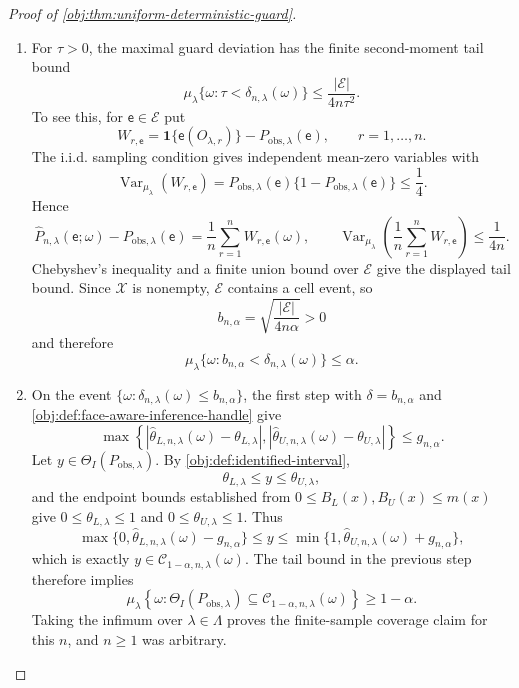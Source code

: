 \documentclass[11pt]{article}
\begin{document}
\begin{proof}[Proof of \cref{obj:thm:uniform-deterministic-guard}]
\begin{enumerate}
\item For \(\tau>0\), the maximal guard deviation has the finite second-moment
tail bound
\[
\mu_\lambda\{\omega:\tau<\delta_{n,\lambda}(\omega)\}
\le
\frac{|\mathcal E|}{4n\tau^2}.
\]
To see this, for \(\mathsf e\in\mathcal E\) put
\[
W_{r,\mathsf e}
=
\mathbf 1\{\mathsf e(O_{\lambda,r})\}
-
P_{\mathrm{obs},\lambda}(\mathsf e),
\qquad r=1,\ldots,n .
\]
The i.i.d. sampling condition gives independent mean-zero variables with
\[
\operatorname{Var}_{\mu_\lambda}(W_{r,\mathsf e})
=
P_{\mathrm{obs},\lambda}(\mathsf e)
\{1-P_{\mathrm{obs},\lambda}(\mathsf e)\}
\le \frac14.
\]
Hence
\[
\widehat P_{n,\lambda}(\mathsf e;\omega)
-
P_{\mathrm{obs},\lambda}(\mathsf e)
=
\frac1n\sum_{r=1}^n W_{r,\mathsf e}(\omega),
\qquad
\operatorname{Var}_{\mu_\lambda}\!\left(
\frac1n\sum_{r=1}^n W_{r,\mathsf e}
\right)
\le
\frac{1}{4n}.
\]
Chebyshev's inequality and a finite union bound over \(\mathcal E\) give the
displayed tail bound.
Since \(\mathcal X\) is nonempty, \(\mathcal E\) contains
a cell event, so
\[
b_{n,\alpha}
=
\sqrt{\frac{|\mathcal E|}{4n\alpha}}>0
\]
and therefore
\[
\mu_\lambda\{\omega:b_{n,\alpha}<\delta_{n,\lambda}(\omega)\}
\le
\alpha .
\]

\item On the event
\(\{\omega:\delta_{n,\lambda}(\omega)\le b_{n,\alpha}\}\), the first step with
\(\delta=b_{n,\alpha}\) and \cref{obj:def:face-aware-inference-handle} give
\[
\max\left\{
\left|\widehat\theta_{L,n,\lambda}(\omega)-\theta_{L,\lambda}\right|,
\left|\widehat\theta_{U,n,\lambda}(\omega)-\theta_{U,\lambda}\right|
\right\}
\le
g_{n,\alpha}.
\]
Let \(y\in\Theta_I(P_{\mathrm{obs},\lambda})\).  By
\cref{obj:def:identified-interval},
\[
\theta_{L,\lambda}\le y\le \theta_{U,\lambda},
\]
and the endpoint bounds established from \(0\le B_L(x),B_U(x)\le m(x)\) give
\(0\le\theta_{L,\lambda}\le1\) and \(0\le\theta_{U,\lambda}\le1\).  Thus
\[
\max\{0,\widehat\theta_{L,n,\lambda}(\omega)-g_{n,\alpha}\}
\le y
\le
\min\{1,\widehat\theta_{U,n,\lambda}(\omega)+g_{n,\alpha}\},
\]
which is exactly
\(y\in\mathcal C_{1-\alpha,n,\lambda}(\omega)\).  The tail bound in the previous
step therefore implies
\[
\mu_\lambda\!\left\{
\omega:
\Theta_I(P_{\mathrm{obs},\lambda})
\subseteq
\mathcal C_{1-\alpha,n,\lambda}(\omega)
\right\}
\ge
1-\alpha .
\]
Taking the infimum over \(\lambda\in\Lambda\) proves the finite-sample coverage
claim for this \(n\), and \(n\ge1\) was arbitrary.


\end{enumerate}
\end{proof}
\end{document}
